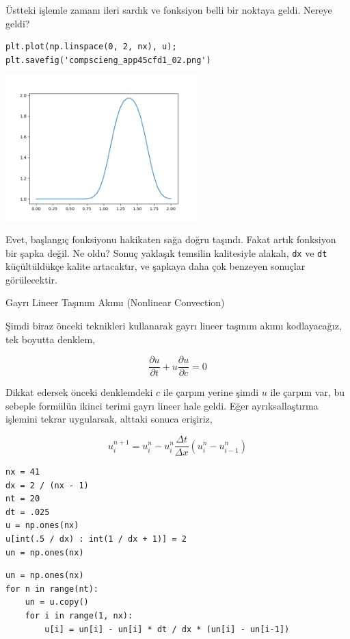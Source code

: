 \documentclass[12pt,fleqn]{article}\usepackage{../../common}
\begin{document}
Üstteki işlemle zamanı ileri sardık ve fonksiyon belli bir noktaya geldi. Nereye
geldi?

\begin{verbatim}
plt.plot(np.linspace(0, 2, nx), u);
plt.savefig('compscieng_app45cfd1_02.png')
\end{verbatim}

\includegraphics[width=20em]{compscieng_app45cfd1_02.png}

Evet, başlangıç fonksiyonu hakikaten sağa doğru taşındı. Fakat artık fonksiyon
bir şapka değil. Ne oldu? Sonuç yaklaşık temsilin kalitesiyle alakalı, \verb!dx!
ve \verb!dt! küçültüldükçe kalite artacaktır, ve şapkaya daha çok benzeyen
sonuçlar görülecektir. 

Gayrı Lineer Taşınım Akımı (Nonlinear Convection)

Şimdi biraz önceki teknikleri kullanarak gayrı lineer taşınım akımı
kodlayacağız, tek boyutta denklem,

$$
\frac{\partial u}{\partial t} +
u  \frac{\partial u}{\partial c}  = 0
$$

Dikkat edersek önceki denklemdeki $c$ ile çarpım yerine şimdi $u$ ile çarpım
var, bu sebeple formülün ikinci terimi gayrı lineer hale geldi. Eğer
ayrıksallaştırma işlemini tekrar uygularsak, alttaki sonuca erişiriz,

$$
u_i^{n+1} = u_i^n -  u_i^n \frac{\Delta t}{\Delta x} ( u_i^n - u_{i-1}^n )
$$

\begin{verbatim}
nx = 41
dx = 2 / (nx - 1)
nt = 20
dt = .025 
u = np.ones(nx)
u[int(.5 / dx) : int(1 / dx + 1)] = 2  
un = np.ones(nx)
\end{verbatim}

\begin{verbatim}
un = np.ones(nx)
for n in range(nt):
    un = u.copy() 
    for i in range(1, nx):
        u[i] = un[i] - un[i] * dt / dx * (un[i] - un[i-1])        
\end{verbatim}
\end{document}
